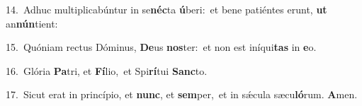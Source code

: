 {\numbfont\textcolor{\numbcolor}{14.}}~Adhuc multiplicabúntur in se\-\textbf{néc}\-ta \textbf{ú}\-beri:~\star et bene patiéntes erunt, \textbf{ut} an\-\textbf{nún}\-tient:\par
{\numbfont\textcolor{\numbcolor}{15.}}~Quóniam rectus Dóminus, \textbf{De}\-us \textbf{nos}\-ter:~\star et non est iníqui\textbf{tas} in \textbf{e}\-o.\par
{\numbfont\textcolor{\numbcolor}{16.}}~Glória \textbf{Pa}\-tri, et \textbf{Fí}\-lio,~\star et Spi\-\textbf{rí}\-tui \textbf{Sanc}\-to.\par
{\numbfont\textcolor{\numbcolor}{17.}}~Sicut erat in princípio, et \textbf{nunc}\-, et \textbf{sem}\-per,~\star et in sǽcula sæcu\-\textbf{ló}\-rum. \textbf{A}\-men.\par
